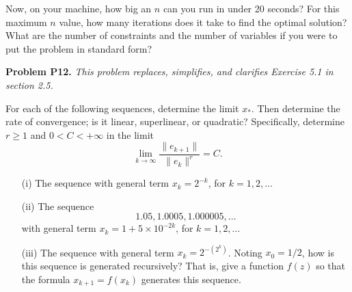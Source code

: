 \documentclass[12pt]{amsart}
\newcommand{\prob}[1]{\bigskip\noindent\textbf{#1}\quad }
\begin{document}
Now, on your machine, how big an $n$ can you run in under 20 seconds?  For this maximum $n$ value, how many iterations does it take to find the optimal solution?  What are the number of constraints and the number of variables if you were to put the problem in standard form?


\prob{Problem P12.}  \emph{This problem replaces, simplifies, and clarifies Exercise 5.1 in section 2.5.}

For each of the following sequences, determine the limit $x_*$.  Then determine the rate of convergence; is it linear, superlinear, or quadratic?  Specifically, determine $r\ge 1$ and $0<C<+\infty$ in the limit
    $$\lim_{k\to\infty} \frac{\|e_{k+1}\|}{\|e_k\|^r} = C.$$

\begin{itemize}
\item[(i)] The sequence with general term $x_k = 2^{-k}$, for $k=1,2,\dots$
\item[(ii)] The sequence
    $$1.05, 1.0005, 1.000005, \dots$$
with general term $x_k = 1 + 5 \times 10^{-2k}$, for $k=1,2,\dots$
\item[(iii)] The sequence with general term $\displaystyle x_k = 2^{-(2^k)}$.  Noting $x_0=1/2$, how is this sequence is generated recursively?  That is, give a function $f(z)$ so that the formula $x_{k+1} = f(x_k)$ generates this sequence.
\end{itemize}
\end{document}
